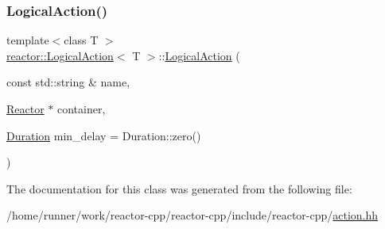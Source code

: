 \subsubsection{\texorpdfstring{Logical\+Action()}{LogicalAction()}}
{\footnotesize\ttfamily template$<$class T $>$ \\
\hyperlink{classreactor_1_1LogicalAction}{reactor\+::\+Logical\+Action}$<$ T $>$\+::\hyperlink{classreactor_1_1LogicalAction}{Logical\+Action} (\begin{DoxyParamCaption}\item[{const std\+::string \&}]{name,  }\item[{\hyperlink{classreactor_1_1Reactor}{Reactor} $\ast$}]{container,  }\item[{\hyperlink{namespacereactor_aa8375b807a80703545664096c5b5b779}{Duration}}]{min\+\_\+delay = {\ttfamily Duration\+:\+:zero()} }\end{DoxyParamCaption})\hspace{0.3cm}{\ttfamily [inline]}}



The documentation for this class was generated from the following file\+:\begin{DoxyCompactItemize}
\item 
/home/runner/work/reactor-\/cpp/reactor-\/cpp/include/reactor-\/cpp/\hyperlink{action_8hh}{action.\+hh}\end{DoxyCompactItemize}
